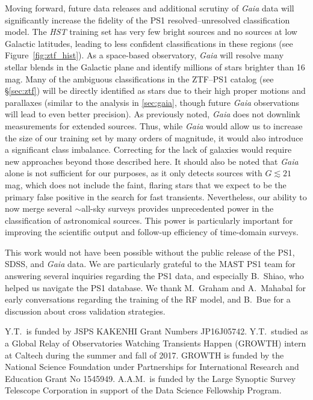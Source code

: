\documentclass[twocolumn, dvipdfmx]{aastex62}
\begin{document}
\begin{CJK*}{UTF8}{gbsn}
Moving forward, future data releases and additional scrutiny of
\textit{Gaia} data will significantly increase the fidelity of the PS1
resolved--unresolved classification model. The \textit{HST} training set has
very few bright sources and no sources at low Galactic latitudes, leading to
less confident classifications in these regions (see
Figure~\ref{fig:ztf_hist}). As a space-based observatory, \textit{Gaia} will
resolve many stellar blends in the Galactic plane and identify millions of
stars brighter than 16\,mag. Many of the ambiguous classifications in the
ZTF--PS1 catalog (see \S\ref{sec:ztf}) will be directly identified as stars
due to their high proper motions and parallaxes (similar to the analysis in
\ref{sec:gaia}, though future \textit{Gaia} observations will lead to even
better precision). As previously noted, \textit{Gaia} does not downlink
measurements for extended sources. Thus, while \textit{Gaia} would allow us
to increase the size of our training set by many orders of magnitude, it
would also introduce a significant class imbalance. Correcting for the lack
of galaxies would require new approaches beyond those described here. It
should also be noted that \textit{Gaia} alone is not sufficient for our
purposes, as it only detects sources with $G \lesssim 21$\,mag, which does
not include the faint, flaring stars that we expect to be the primary false
positive in the search for fast transients. Nevertheless, our ability to now
merge several $\sim$all-sky surveys provides unprecedented power in the
classification of astronomical sources. This power is particularly important
for improving the scientific output and follow-up efficiency of time-domain
surveys.

\acknowledgements

This work would not have been possible without the public release of the
PS1, SDSS, and \textit{Gaia} data. We are particularly grateful to the MAST
PS1 team for answering several inquiries regarding the PS1 data, and
especially B.~Shiao, who helped us navigate the PS1 database. We thank
M.~Graham and A.~Mahabal for early conversations regarding the training of
the RF model, and B.~Bue for a discussion about cross validation strategies.

Y.T.\ is funded by JSPS KAKENHI Grant Numbers JP16J05742. Y.T.\ studied as a
Global Relay of Observatories Watching Transients Happen (GROWTH) intern at
Caltech during the summer and fall of 2017. GROWTH is funded by the National
Science Foundation under Partnerships for International Research and
Education Grant No 1545949. A.A.M.\ is funded by the Large Synoptic Survey
Telescope Corporation in support of the Data Science Fellowship Program.


\end{CJK*}
\end{document}
